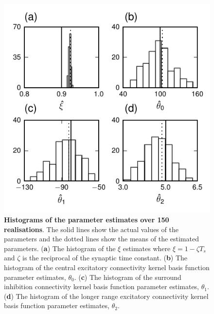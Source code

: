 \documentclass[12pt]{iopart}
\begin{document}
\begin{figure}[!ht]
\begin{center}
\includegraphics{./Graph/pdf/Figure7.pdf}
\end{center}
\caption{{\bf Histograms of the parameter estimates over 150
realisations}. The solid lines show the actual values of the parameters and the dotted lines show the means of the estimated parameters. (\textbf{a}) The histogram of the $\xi$ estimates where $\xi=1-\zeta T_s $ and $\zeta$ is the reciprocal of the synaptic time constant. (\textbf{b}) The histogram of the central excitatory connectivity kernel basis function parameter estimates, $\theta_0$. (\textbf{c}) The histogram of the surround inhibition connectivity kernel basis function parameter estimates, $\theta_1$. (\textbf{d}) The histogram of the longer range excitatory connectivity kernel basis function parameter estimates, $\theta_2$.}
\label{fig:Figure7}
\end{figure}
\end{document}

